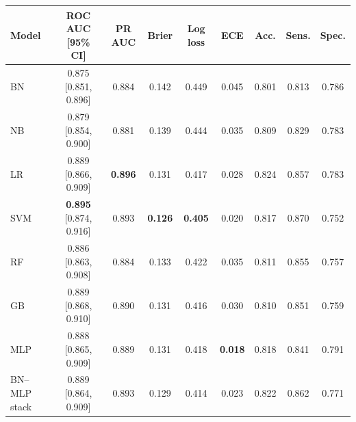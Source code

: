 \begin{tabular}{lcccccccc}
\toprule
Model & ROC AUC [95\% CI] & PR AUC & Brier & Log loss & ECE & Acc. & Sens. & Spec. \\
\midrule
BN & 0.875 [0.851, 0.896] & 0.884 & 0.142 & 0.449 & 0.045 & 0.801 & 0.813 & 0.786 \\
NB & 0.879 [0.854, 0.900] & 0.881 & 0.139 & 0.444 & 0.035 & 0.809 & 0.829 & 0.783 \\
LR & 0.889 [0.866, 0.909] & \textbf{0.896} & 0.131 & 0.417 & 0.028 & 0.824 & 0.857 & 0.783 \\
SVM & \textbf{0.895} [0.874, 0.916] & 0.893 & \textbf{0.126} & \textbf{0.405} & 0.020 & 0.817 & 0.870 & 0.752 \\
RF & 0.886 [0.863, 0.908] & 0.884 & 0.133 & 0.422 & 0.035 & 0.811 & 0.855 & 0.757 \\
GB & 0.889 [0.868, 0.910] & 0.890 & 0.131 & 0.416 & 0.030 & 0.810 & 0.851 & 0.759 \\
\midrule
MLP & 0.888 [0.865, 0.909] & 0.889 & 0.131 & 0.418 & \textbf{0.018} & 0.818 & 0.841 & 0.791 \\
BN--MLP stack & 0.889 [0.864, 0.909] & 0.893 & 0.129 & 0.414 & 0.023 & 0.822 & 0.862 & 0.771 \\
\bottomrule
\end{tabular}
